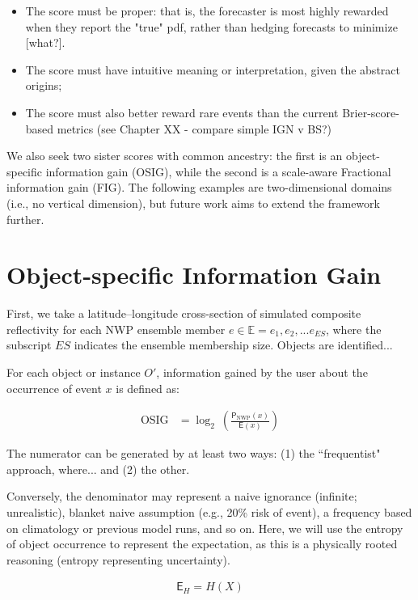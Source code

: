 \documentclass{ametsoc}
\newcommand*{\expect}{\mathsf{E}}
\newcommand*{\prob}{\mathsf{P}}
\begin{document}
\begin{itemize}
    \item The score must be proper: that is, the forecaster is most highly rewarded when they report the "true" pdf, rather than hedging forecasts to minimize [what?].
    \item The score must have intuitive meaning or interpretation, given the abstract origins;
    \item The score must also better reward rare events than the current Brier-score-based metrics (see Chapter XX - compare simple IGN v BS?)
\end{itemize}

We also seek two sister scores with common ancestry: the first is an object-specific information gain (OSIG), while the second is a scale-aware Fractional information gain (FIG). The following examples are two-dimensional domains (i.e., no vertical dimension), but future work aims to extend the framework further.

\section{Object-specific Information Gain}
First, we take a latitude--longitude cross-section of simulated composite reflectivity for each NWP ensemble member $e \in \mathbb{E} = {e_1, e_2, ... e_{ES}}$, where the subscript $ES$ indicates the ensemble membership size. Objects are identified...

For each object or instance $O'$, information gained by the user about the occurrence of event $x$ is defined as:


\begin{align}
    \textrm{OSIG} &=  \log_{2}~\left(\frac{\prob_\textrm{NWP}(x)}{\expect(x)}\right)
\end{align}

The numerator can be generated by at least two ways: (1) the ``frequentist" approach, where... and (2) the other. 

Conversely, the denominator may represent a naive ignorance (infinite; unrealistic), blanket naive assumption (e.g., 20\% risk of event), a frequency based on climatology or previous model runs, and so on. Here, we will use the entropy of object occurrence to represent the expectation, as this is a physically rooted reasoning (entropy representing uncertainty).

\begin{align}
    \mathsf{E}_H = H(X)
\end{align}
\end{document}
